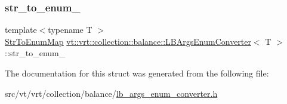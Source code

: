 \subsubsection{\texorpdfstring{str\+\_\+to\+\_\+enum\+\_\+}{str\_to\_enum\_}}
{\footnotesize\ttfamily template$<$typename T $>$ \\
\hyperlink{structvt_1_1vrt_1_1collection_1_1balance_1_1_l_b_args_enum_converter_a4addf8d7b128d0e5de627e60b4c299bf}{Str\+To\+Enum\+Map} \hyperlink{structvt_1_1vrt_1_1collection_1_1balance_1_1_l_b_args_enum_converter}{vt\+::vrt\+::collection\+::balance\+::\+L\+B\+Args\+Enum\+Converter}$<$ T $>$\+::str\+\_\+to\+\_\+enum\+\_\+\hspace{0.3cm}{\ttfamily [private]}}



The documentation for this struct was generated from the following file\+:\begin{DoxyCompactItemize}
\item 
src/vt/vrt/collection/balance/\hyperlink{lb__args__enum__converter_8h}{lb\+\_\+args\+\_\+enum\+\_\+converter.\+h}\end{DoxyCompactItemize}
